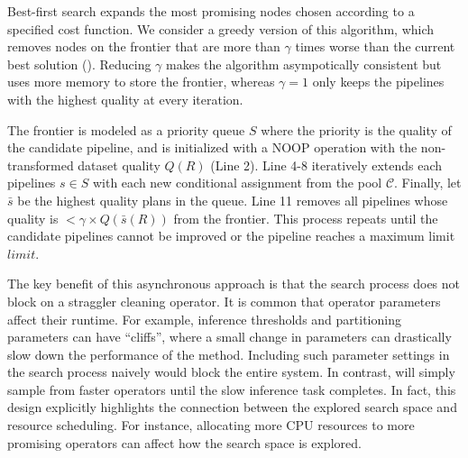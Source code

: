 Best-first search expands the most promising nodes chosen according to a specified cost function.
We consider a greedy version of this algorithm, which removes nodes on the frontier that are more than $\gamma$ times worse than the current best solution ().
Reducing $\gamma$  makes the algorithm asympotically consistent but uses more memory to store the frontier, whereas $\gamma=1$ only keeps the pipelines with the highest quality at every iteration.  

The frontier is modeled as a priority queue $S$ where the priority is the quality of the candidate pipeline, and is initialized with a NOOP operation with the non-transformed dataset quality $Q(R)$ (Line 2).  
Line 4-8 iteratively extends each pipelines $s\in S$ with each new conditional assignment from the pool $\mathcal{C}$.  
Finally, let $\bar{s}$ be the highest quality plans in the queue. Line 11 removes all pipelines whose quality is $<\gamma\times Q(\bar{s}(R))$ from the frontier.  
This process repeats until the candidate pipelines cannot be improved or the pipeline reaches a maximum limit $limit$.



 The key benefit of this asynchronous approach is that the search process does not block on a straggler cleaning operator.  It is common that operator parameters affect their runtime.  For example, inference thresholds and partitioning parameters can have ``cliffs'', where a small change in parameters can drastically slow down the performance of the method. Including such parameter settings in the search process naively would block the entire system.  In contrast, \sys will simply sample from faster operators until the slow inference task completes.    In fact, this design explicitly highlights the connection between the explored search space and resource scheduling.  For instance,  allocating more CPU resources to more promising operators can affect how the search space is explored.

